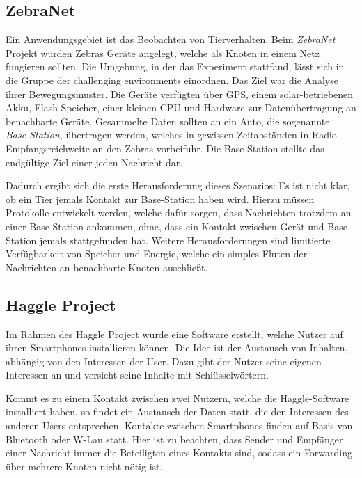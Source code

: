 \documentclass[a4paper, 12pt]{article}
\begin{document}
\subsection{ZebraNet}
\label{sec:applications:zebranet}
Ein Anwendungsgebiet ist das Beobachten von Tierverhalten. 
Beim \emph{ZebraNet} Projekt \cite{juang2002energy} wurden Zebras Geräte angelegt, welche als Knoten in einem Netz fungieren sollten. Die Umgebung, in der das Experiment stattfand, lässt sich in die Gruppe der challenging environments einordnen. Das Ziel war die Analyse ihrer Bewegungsmuster. Die Geräte verfügten über GPS, einem solar-betriebenen Akku, Flash-Speicher, einer kleinen CPU und Hardware zur Datenübertragung an benachbarte Geräte. Gesammelte Daten sollten an ein Auto, die sogenannte \emph{Base-Station}, übertragen werden, welches in gewissen Zeitabständen in Radio-Empfangsreichweite an den Zebras vorbeifuhr. Die Base-Station stellte das endgültige Ziel einer jeden Nachricht dar.

Dadurch ergibt sich die erste Herausforderung dieses Szenarios: Es ist nicht klar, ob ein Tier jemals Kontakt zur Base-Station haben wird.
Hierzu müssen Protokolle entwickelt werden, welche dafür sorgen, dass Nachrichten trotzdem an einer Base-Station ankommen, ohne, dass ein Kontakt zwischen Gerät und Base-Station jemals stattgefunden hat.
Weitere Herausforderungen sind limitierte Verfügbarkeit von Speicher und Energie, welche ein simples Fluten der Nachrichten an benachbarte Knoten auschließt.

\subsection{Haggle Project}
\label{sec:applications:haggle}
Im Rahmen des Haggle Project \cite{haggleProj} wurde eine Software erstellt, welche Nutzer auf ihren Smartphones installieren können. Die Idee ist der Austausch von Inhalten, abhängig von den Interessen der User. Dazu gibt der Nutzer seine eigenen Interessen an und versieht seine Inhalte mit Schlüsselwörtern.

Kommt es zu einem Kontakt zwischen zwei Nutzern, welche die Haggle-Software installiert haben, so findet ein Austausch der Daten statt, die den Interessen des anderen Users entsprechen.
Kontakte zwischen Smartphones finden auf Basis von Bluetooth oder W-Lan statt.
Hier ist zu beachten, dass Sender und Empfänger einer Nachricht immer die Beteiligten eines Kontakts sind, sodass ein Forwarding über mehrere Knoten nicht nötig ist.
\end{document}

